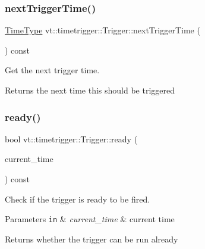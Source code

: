 \subsubsection{\texorpdfstring{next\+Trigger\+Time()}{nextTriggerTime()}}
{\footnotesize\ttfamily \hyperlink{namespacevt_a876a9d0cd5a952859c72de8a46881442}{Time\+Type} vt\+::timetrigger\+::\+Trigger\+::next\+Trigger\+Time (\begin{DoxyParamCaption}{ }\end{DoxyParamCaption}) const\hspace{0.3cm}{\ttfamily [inline]}}



Get the next trigger time. 

\begin{DoxyReturn}{Returns}
the next time this should be triggered 
\end{DoxyReturn}
\mbox{\label{structvt_1_1timetrigger_1_1_trigger_af00027850254b42fbcc2f5fde829b386}} 
\subsubsection{\texorpdfstring{ready()}{ready()}}
{\footnotesize\ttfamily bool vt\+::timetrigger\+::\+Trigger\+::ready (\begin{DoxyParamCaption}\item[{\hyperlink{namespacevt_a876a9d0cd5a952859c72de8a46881442}{Time\+Type}}]{current\+\_\+time }\end{DoxyParamCaption}) const\hspace{0.3cm}{\ttfamily [inline]}}



Check if the trigger is ready to be fired. 


\begin{DoxyParams}[1]{Parameters}
\mbox{\tt in}  & {\em current\+\_\+time} & current time\\
\hline
\end{DoxyParams}
\begin{DoxyReturn}{Returns}
whether the trigger can be run already 
\end{DoxyReturn}
\mbox{\label{structvt_1_1timetrigger_1_1_trigger_a44688f64be94b9c821768b55a3a236f7}} 
